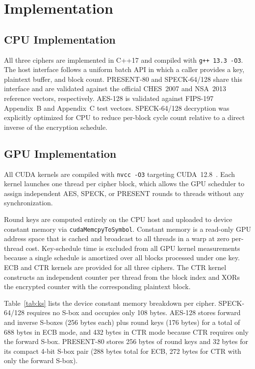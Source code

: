 \documentclass[conference]{IEEEtran}
\begin{document}
\section{Implementation}

\subsection{CPU Implementation}

All three ciphers are implemented in C++17 and compiled with \texttt{g++ 13.3 -O3}. The host interface
follows a uniform batch API in which a caller provides a key, plaintext buffer, and block count.
PRESENT-80 and SPECK-64/128 share this interface and are validated against the official CHES~2007
and NSA~2013 reference vectors, respectively. AES-128 is validated against FIPS-197 Appendix~B and
Appendix~C test vectors. SPECK-64/128 decryption was explicitly optimized for CPU to reduce per-block
cycle count relative to a direct inverse of the encryption schedule.

\subsection{GPU Implementation}

All CUDA kernels are compiled with \texttt{nvcc -O3} targeting CUDA~12.8~\cite{cuda}. Each kernel launches one
thread per cipher block, which allows the GPU scheduler to assign independent AES, SPECK, or PRESENT
rounds to threads without any synchronization.

Round keys are computed entirely on the CPU host and uploaded to device constant memory via
\texttt{cudaMemcpyToSymbol}. Constant memory is a read-only GPU address space that is cached and
broadcast to all threads in a warp at zero per-thread cost. Key-schedule time is excluded from all
GPU kernel measurements because a single schedule is amortized over all blocks processed under one
key. ECB and CTR kernels are provided for all three ciphers. The CTR kernel constructs an independent
counter per thread from the block index and XORs the encrypted counter with the corresponding
plaintext block.

Table~\ref{tab:ks} lists the device constant memory breakdown per cipher. SPECK-64/128 requires no
S-box and occupies only 108 bytes. AES-128 stores forward and inverse S-boxes (256 bytes each) plus
round keys (176 bytes) for a total of 688 bytes in ECB mode, and 432 bytes in CTR mode because CTR
requires only the forward S-box. PRESENT-80 stores 256 bytes of round keys and 32 bytes for its
compact 4-bit S-box pair (288 bytes total for ECB, 272 bytes for CTR with only the forward S-box).
\end{document}

